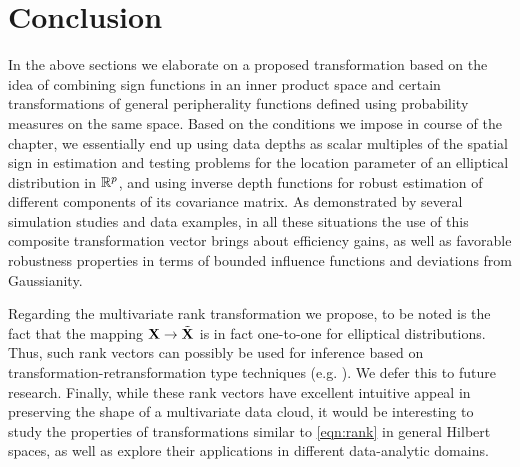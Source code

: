 %

\section{Conclusion}\label{section:sec7}
\label{section:Conclusion}
In the above sections we elaborate on a proposed transformation based on the idea of combining sign functions in an inner product space and certain transformations of general peripherality functions defined using probability measures on the same space. Based on the conditions we impose in course of the chapter, we essentially end up using data depths as scalar multiples of the spatial sign in estimation and testing problems for the location parameter of an elliptical distribution in ${\mathbb{R}}^p$, and using inverse depth functions for robust estimation of different components of its covariance matrix. As demonstrated by several simulation studies and data examples, in all these situations the use of this composite transformation vector brings about efficiency gains, as well as favorable robustness properties in terms of bounded influence functions and deviations from Gaussianity.

Regarding the multivariate rank transformation we propose, to be noted is the fact that the mapping ${\mathbf{X}} \rightarrow \tilde {{\mathbf{X}}}$ is in fact one-to-one for elliptical distributions. Thus, such rank vectors can possibly be used for inference based on transformation-retransformation type techniques (e.g. \cite{ChakrabortyChaudhuri96,ChakrabortyChaudhuriOja98}). We defer this to future research. Finally, while these rank vectors have excellent intuitive appeal in preserving the shape of a multivariate data cloud, it would be interesting to study the properties of transformations similar to \eqref{eqn:rank} in general Hilbert spaces, as well as explore their applications in different data-analytic domains.